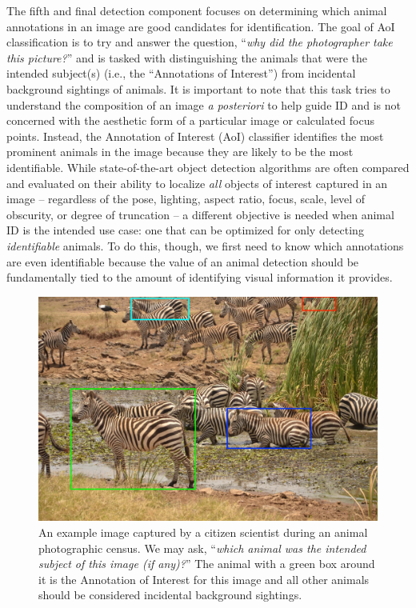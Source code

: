 The fifth and final detection component focuses on determining which animal annotations in an image are good candidates for identification.  The goal of AoI classification is to try and answer the question, ``\textit{why did the photographer take this picture?}'' and is tasked with distinguishing the animals that were the intended subject(s) (i.e., the ``Annotations of Interest'') from incidental background sightings of animals.  It is important to note that this task tries to understand the composition of an image \textit{a posteriori} to help guide ID and is not concerned with the aesthetic form of a particular image or calculated focus points.  Instead, the Annotation of Interest (AoI) classifier identifies the most prominent animals in the image because they are likely to be the most identifiable.  While state-of-the-art object detection algorithms are often compared and evaluated on their ability to localize \textit{all} objects of interest captured in an image -- regardless of the pose, lighting, aspect ratio, focus, scale, level of obscurity, or degree of truncation -- a different objective is needed when animal ID is the intended use case: one that can be optimized for only detecting \textit{identifiable} animals.  To do this, though, we first need to know which annotations are even identifiable because the value of an animal detection should be fundamentally tied to the amount of identifying visual information it provides.

\begin{figure}[!t]
    \begin{center}
        \includegraphics[width=0.90\linewidth]{resources/overview.pdf}
    \end{center}
    \caption{An example image captured by a citizen scientist during an animal photographic census.  We may ask, ``\textit{which animal was the intended subject of this image (if any)?}''  The animal with a green box around it is the Annotation of Interest for this image and all other animals should be considered incidental background sightings.}
    \label{fig:overview}
\end{figure}

